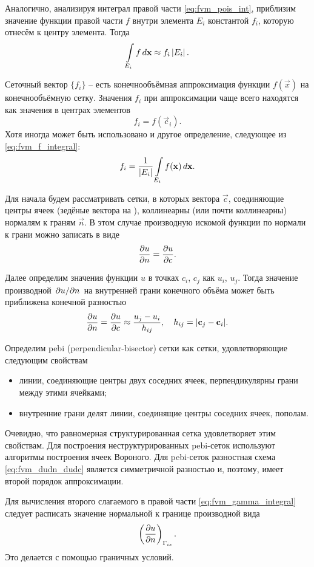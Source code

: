 Аналогично, анализируя интеграл правой части \cref{eq:fvm_pois_int},
приблизим значение функции правой части $f$ внутри элемента $E_i$ константой $f_i$,
которую отнесём к центру элемента. Тогда
\begin{equation}
\label{eq:fvm_f_integral}
\arint{f}{E_i}{\vec x} \approx f_i \left|E_i\right|.
\end{equation}

Сеточный вектор $\{f_i\}$ -- есть конечнообъёмная аппроксимация
функции $f(\vec x)$ на конечнообъёмную сетку.
Значения $f_i$ при аппроксимации чаще всего находятся как значения в центрах элементов
$$
f_i = f(\vec c_i).
$$
Хотя иногда может быть использовано и другое определение,
следующее из \eqref{eq:fvm_f_integral}:
$$
f_i = \frac{1}{\left| E_i \right|} \arint{f(\vec x)}{E_i}{\vec x}.
$$


Для начала будем рассматривать сетки, в
которых вектора $\vec c$, соединяющие центры ячеек (зедёные вектора на ),
коллинеарны (или почти коллинеарны) нормалям к граням $\vec n$.
В этом случае производную искомой функции по нормали к грани можно записать в виде
$$
\dfr{u}{n} = \dfr{u}{c}.
$$

Далее определим значения функции $u$ в точках $c_i$, $c_j$ как $u_i$, $u_j$.
Тогда значение производной $\dsfr{u}{n}$ на внутренней грани конечного объёма
может быть приближена конечной разностью
\begin{equation}
\label{eq:fvm_dudn_dudc}
\dfr{u}{n} = \dfr{u}{c} \approx \frac{u_j - u_i}{h_{ij}}, \quad h_{ij} = |\vec c_j - \vec c_i|.
\end{equation}

Определим pebi (perpendicular-bisector) сетки как сетки, удовлетворяющие следующим свойствам
\begin{itemize}
\item линии, соединяющие центры двух соседних ячеек, перпендикулярны грани между этими ячейками;
\item внутренние грани делят линии, соединящие центры соседних ячеек, пополам.
\end{itemize}
Очевидно, что равномерная структурированная сетка удовлетворяет этим свойствам.
Для построения неструктурированных pebi-сеток используют алгоритмы построения ячеек Вороного.
Для pebi-сеток разностная схема \eqref{eq:fvm_dudn_dudc}
является симметричной разностью и, поэтому, имеет второй порядок аппроксимации.

Для вычисления второго слагаемого в правой части 
\cref{eq:fvm_gamma_integral}
следует расписать значение нормальной 
к границе производной вида
$$
\left(\dfr{u}{n}\right)_{\Gamma_{is}}.
$$
Это делается с помощью граничных условий.

